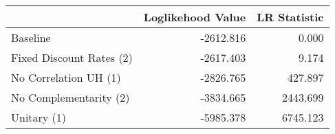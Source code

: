 \begin{tabular}{lrr}
\toprule
{} & Loglikehood Value & LR Statistic \\
\midrule
Baseline                 &         -2612.816 &        0.000 \\
Fixed Discount Rates (2) &         -2617.403 &        9.174 \\
No Correlation UH (1)    &         -2826.765 &      427.897 \\
No Complementarity (2)   &         -3834.665 &     2443.699 \\
Unitary (1)              &         -5985.378 &     6745.123 \\
\bottomrule
\end{tabular}
